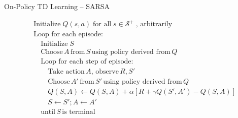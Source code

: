 \documentclass[ignorenonframetext,xcolor=x11names]{beamer}
\begin{document}

\begin{frame}[label=full]{On-Policy TD Learning -- SARSA}
\begin{block}{}
\begin{align*}
& \text{Initialize}\; Q(s, a) \; \text{for all} \; s \in \mathcal{S}^+ \; \text{, arbitrarily} \\
& \text{Loop for each episode:} \\
& \quad \text{Initialize}\; S \\
& \quad \text{Choose} \, A \, \text{from}\, S \, \text{using policy derived from} \, Q \\
& \quad \text{Loop for each step of episode:} \\
& \quad \quad \text{Take action}\, A, \, \text{observe} \, R, S' \\
& \quad \quad \text{Choose}\, A' \, \text{from}\, S' \, \text{using policy derived from} \, Q \\ 
& \quad \quad Q(S, A) \leftarrow Q(S, A) + \alpha \left[ R + \gamma Q(S', A') - Q(S, A) \right] \\
& \quad \quad S \leftarrow S'; A \leftarrow A' \\
& \quad \text{until}\, S\, \text{is terminal}
\end{align*}
\end{block}
\end{frame}
\end{document}
